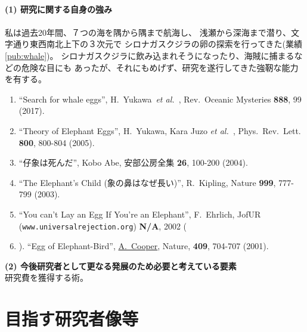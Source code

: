 \documentclass[11pt,a4j,dvipdfmx]{jarticle} 					%
\newcommand{\研究課題名}{象の卵}
\newcommand{\研究機関名}{逢坂大学}
\newcommand{\研究代表者氏名}{湯川秀樹}
\newcommand{\paper}[6]{%
	\item ``#1'', #2, #3 {\bf #4}, #5 (#6).			%
}
\newcommand{\etal}{\textit{et al.\ }}
\newcommand{\yukawa}{H.~Yukawa}					%
\newcommand{\prl}{Phys.\ Rev.\ Lett.\ }		%
\begin{document}
\SelfReviewInstructions\\%
\noindent
\textbf{(1) 研究に関する自身の強み}\\
\PapersInstructions\\ %
	私は過去20年間、７つの海を隅から隅まで航海し、
	浅瀬から深海まで潜り、文字通り東西南北上下の３次元で
	シロナガスクジラの卵の探索を行ってきた(業績\ref{pub:whale})。		%
	シロナガスクジラに飲み込まれそうになったり、海賊に捕まるなどの危険な目にも
	あったが、それにもめげず、研究を遂行してきた強靭な能力を有する。
	\begin{enumerate}
		\paper{Search for whale eggs}{\yukawa\ \etal}{Rev.\ Oceanic Mysteries}{888}{99}{2017}
			\label{pub:whale}
				
		\paper{Theory of Elephant Eggs}{\yukawa, Kara Juzo \etal}{\prl}{800}{800-804}{2005}
			\label{pub:theoegg}
				
		\paper{仔象は死んだ}{Kobo Abe}{安部公房全集}{26}{100-200}{2004}
		
		\paper{The Elephant's Child (象の鼻はなぜ長い)}{R.~Kipling}{Nature}{999}{777-799}{2003}

		\paper{You can't Lay an Egg If You're an Elephant}{F.~Ehrlich}
			{JofUR\\({\tt www.universalrejection.org})}{{\bf N/A}}{2002}
		
		\item ``Egg of Elephant-Bird'', 
				\underline{A.~Cooper},
				Nature, {\bf 409}, 704-707 (2001).	%
	\end{enumerate}

\vspace{5mm}
\noindent
\textbf{(2) 今後研究者として更なる発展のため必要と考えている要素}\\
研究費を獲得する術。




\section{目指す研究者像等}
\end{document}
